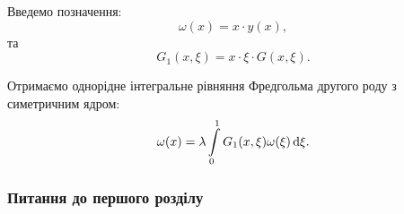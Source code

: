 \begin{solution}
	Введемо позначення:
	\begin{equation*}
		\omega(x) = x \cdot y(x),
	\end{equation*}
	та
	\begin{equation*}
		G_1(x, \xi) = x \cdot \xi \cdot G(x,\xi).
	\end{equation*}

	Отримаємо однорідне інтегральне рівняння Фредгольма другого роду з симетричним ядром:
	\begin{equation*}
		\omega(x) = \lambda \displaystyle\int\limits_0^1 G_1(x, \xi) \omega(\xi) \mathop{}\!\mathrm{d} \xi.
	\end{equation*}
\end{solution}

\newpage

\subsubsection{Питання до першого розділу}
